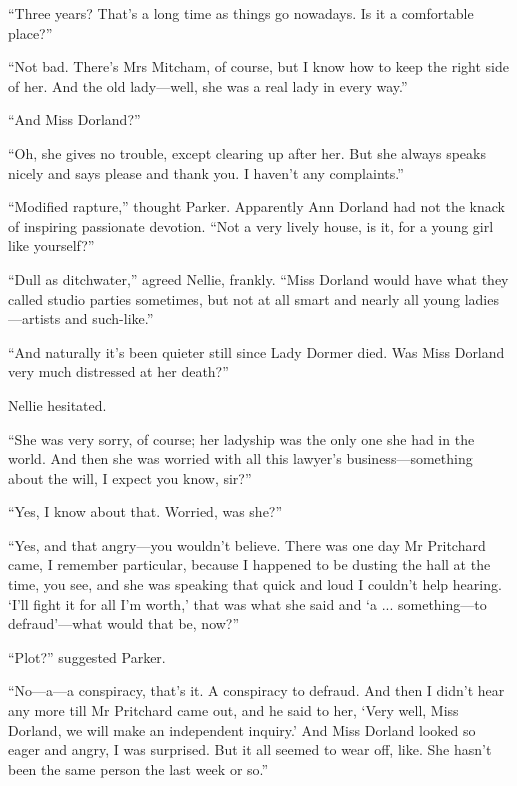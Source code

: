 \enquote{Three years? That's a long time as things go nowadays. Is it a comfortable place?}

\enquote{Not bad. There's Mrs Mitcham, of course, but I know how to keep the right side of her. And the old lady\allowbreak---\allowbreak well, she was a real lady in every way.}

\enquote{And Miss Dorland?}

\enquote{Oh, she gives no trouble, except clearing up after her. But she always speaks nicely and says please and thank you. I haven't any complaints.}

\enquote{Modified rapture,} thought Parker. Apparently Ann Dorland had not the knack of inspiring passionate devotion. \enquote{Not a very lively house, is it, for a young girl like yourself?}

\enquote{Dull as ditchwater,} agreed Nellie, frankly. \enquote{Miss Dorland would have what they called studio parties sometimes, but not at all smart and nearly all young ladies\allowbreak---\allowbreak artists and such-like.}

\enquote{And naturally it's been quieter still since Lady Dormer died. Was Miss Dorland very much distressed at her death?}

Nellie hesitated.

\enquote{She was very sorry, of course; her ladyship was the only one she had in the world. And then she was worried with all this lawyer's business\allowbreak---\allowbreak something about the will, I expect you know, sir?}

\enquote{Yes, I know about that. Worried, was she?}

\enquote{Yes, and that angry\allowbreak---\allowbreak you wouldn't believe. There was one day Mr Pritchard came, I remember particular, because I happened to be dusting the hall at the time, you see, and she was speaking that quick and loud I couldn't help hearing. \enquote{I'll fight it for all I'm worth,} that was what she said and \enquote{a ... something\allowbreak---\allowbreak to defraud}---what would that be, now?}

\enquote{Plot?} suggested Parker.

\enquote{No\allowbreak---\allowbreak a---a conspiracy, that's it. A conspiracy to defraud. And then I didn't hear any more till Mr Pritchard came out, and he said to her, \enquote{Very well, Miss Dorland, we will make an independent inquiry.} And Miss Dorland looked so eager and angry, I was surprised. But it all seemed to wear off, like. She hasn't been the same person the last week or so.}

